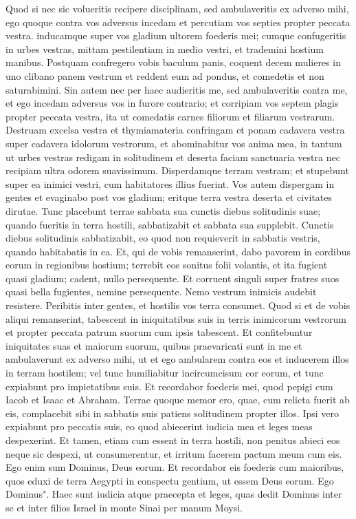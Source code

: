 \begin{biblechapter}
\verse Quod si nec sic volueritis recipere disciplinam, sed ambulaveritis ex adverso mihi, 
\verse ego quoque contra vos adversus incedam et percutiam vos septies propter peccata vestra. 
\verse inducamque super vos gladium ultorem foederis mei; cumque confugeritis in urbes vestras, mittam pestilentiam in medio vestri, et trademini hostium manibus. 
\verse Postquam confregero vobis baculum panis, coquent decem mulieres in uno clibano panem vestrum et reddent eum ad pondus, et comedetis et non saturabimini. 
\verse Sin autem nec per haec audieritis me, sed ambulaveritis contra me, 
\verse et ego incedam adversus vos in furore contrario; et corripiam vos septem plagis propter peccata vestra, 
\verse ita ut comedatis carnes filiorum et filiarum vestrarum. 
\verse Destruam excelsa vestra et thymiamateria confringam et ponam cadavera vestra super cadavera idolorum vestrorum, et abominabitur vos anima mea, 
\verse in tantum ut urbes vestras redigam in solitudinem et deserta faciam sanctuaria vestra nec recipiam ultra odorem suavissimum. 
\verse Disperdamque terram vestram; et stupebunt super ea inimici vestri, cum habitatores illius fuerint. 
\verse Vos autem dispergam in gentes et evaginabo post vos gladium; eritque terra vestra deserta et civitates dirutae. 
\verse Tunc placebunt terrae sabbata sua cunctis diebus solitudinis suae; quando fueritis in terra hostili, sabbatizabit et sabbata sua supplebit. 
\verse Cunctis diebus solitudinis sabbatizabit, eo quod non requieverit in sabbatis vestris, quando habitabatis in ea. 
\verse Et, qui de vobis remanserint, dabo pavorem in cordibus eorum in regionibus hostium; terrebit eos sonitus folii volantis, et ita fugient quasi gladium; cadent, nullo persequente. 
\verse Et corruent singuli super fratres suos quasi bella fugientes, nemine persequente. Nemo vestrum inimicis audebit resistere.  
\verse Peribitis inter gentes, et hostilis vos terra consumet. 
\verse Quod si et de vobis aliqui remanserint, tabescent in iniquitatibus suis in terris inimicorum vestrorum et propter peccata patrum suorum cum ipsis tabescent. 
\verse Et confitebuntur iniquitates suas et maiorum suorum, quibus praevaricati sunt in me et ambulaverunt ex adverso mihi, 
\verse ut et ego ambularem contra eos et inducerem illos in terram hostilem; vel tunc humiliabitur incircumcisum cor eorum, et tunc expiabunt pro impietatibus suis. 
\verse Et recordabor foederis mei, quod pepigi cum Iacob et Isaac et Abraham. Terrae quoque memor ero, 
\verse quae, cum relicta fuerit ab eis, complacebit sibi in sabbatis suis patiens solitudinem propter illos. Ipsi vero expiabunt pro peccatis suis, eo quod abiecerint iudicia mea et leges meas despexerint. 
\verse Et tamen, etiam cum essent in terra hostili, non penitus abieci eos neque sic despexi, ut consumerentur, et irritum facerem pactum meum cum eis. Ego enim sum Dominus, Deus eorum. 
\verse Et recordabor eis foederis cum maioribus, quos eduxi de terra Aegypti in conspectu gentium, ut essem Deus eorum. Ego Dominus". 
\verse Haec sunt iudicia atque praecepta et leges, quas dedit Dominus inter se et inter filios Israel in monte Sinai per manum Moysi. 
\end{biblechapter}

